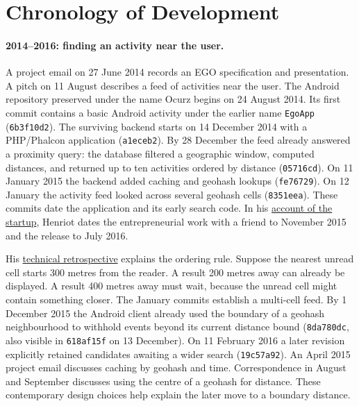 \documentclass[11pt]{article}
\begin{document}
\section{Chronology of Development}\hypertarget{ix:chronology}{}
\paragraph{2014--2016: finding an activity near the user.}
A project email on 27 June 2014 records an EGO specification and presentation. A pitch on 11 August describes a feed of activities near the user. The Android repository preserved under the name Ocurz begins on 24 August 2014. Its first commit contains a basic Android activity under the earlier name \texttt{EgoApp} (\texttt{6b3f10d2}). The surviving backend starts on 14 December 2014 with a PHP/Phalcon application (\texttt{a1eceb2}). By 28 December the feed already answered a proximity query: the database filtered a geographic window, computed distances, and returned up to ten activities ordered by distance (\texttt{05716cd}). On 11 January 2015 the backend added caching and geohash lookups (\texttt{fe76729}). On 12 January the activity feed looked across several geohash cells (\texttt{8351eea}). These commits date the application and its early search code. In his \href{https://remi.news/articles/2024-08-02-the-startup-journey/}{account of the startup}, Henriot dates the entrepreneurial work with a friend to November 2015 and the release to July 2016.

His \href{https://remi.news/articles/2024-08-07-the-beginnings-of-the-protocol/}{technical retrospective} explains the ordering rule. Suppose the nearest unread cell starts 300 metres from the reader. A result 200 metres away can already be displayed. A result 400 metres away must wait, because the unread cell might contain something closer. The January commits establish a multi-cell feed. By 1 December 2015 the Android client already used the boundary of a geohash neighbourhood to withhold events beyond its current distance bound (\texttt{8da780dc}, also visible in \texttt{618af15f} on 13 December). On 11 February 2016 a later revision explicitly retained candidates awaiting a wider search (\texttt{19c57a92}). An April 2015 project email discusses caching by geohash and time. Correspondence in August and September discusses using the centre of a geohash for distance. These contemporary design choices help explain the later move to a boundary distance.
\end{document}
